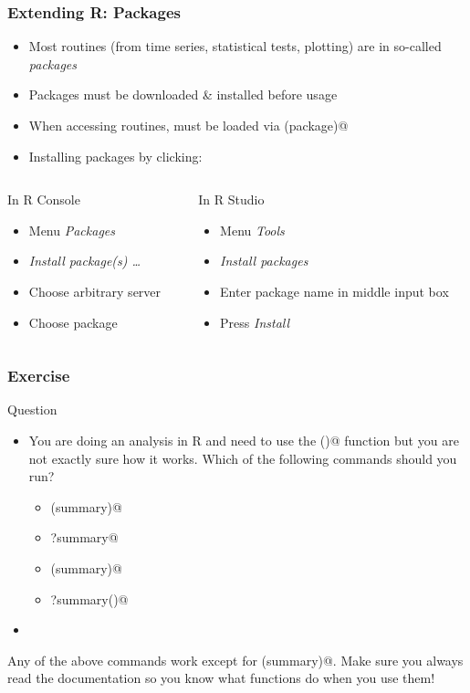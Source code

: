 \documentclass[%
  final,
  11pt, 
  show notes, %
  t, %
  fleqn, %
]{beamer}
\begin{document}
\begin{frame}[fragile]
  \frametitle{Extending R: Packages}
\vfill
\begin{itemize}
	\item Most routines (from \eg time series, statistical tests, plotting) are in so-called \emph{packages}
	\item Packages must be downloaded \& installed before usage
	\item When accessing routines, must be loaded via \verb@library(package)@
	\item Installing packages by clicking:
\end{itemize}
\begin{columns}[T]
\begin{column}{.45\textwidth}
\begin{block}{In R Console}
\begin{itemize}
\item Menu \emph{Packages} 
\item \emph{Install package(s) \ldots} 
\item Choose arbitrary server 
\item Choose package
\end{itemize}
\end{block}
\end{column}
\begin{column}{.45\textwidth}
\begin{block}{In R Studio}
\begin{itemize}
\item Menu \emph{Tools} 
\item \emph{Install packages} 
\item Enter package name in middle input box 
\item Press \emph{Install}
\end{itemize}
\end{block}
\end{column}
\end{columns}
\end{frame}

\begin{frame}[fragile]
  \frametitle{Exercise}
\vfill
\begin{exampleblock}{Question}
\begin{itemize}
\item You are doing an analysis in R and need to use the \verb@summary()@ function but you are not exactly sure how it works. Which of the following commands should you run?
\begin{itemize}
\item \verb@help(summary)@
\item \verb@?summary@
\item \verb@man(summary)@
\item \verb@?summary()@
\end{itemize}
\item \CourseQuiz
\end{itemize}
\end{exampleblock}
\ifQuizSolution
Any of the above commands work except for \verb@man(summary)@. Make sure you always read the documentation so you know what functions do when you use them!
\fi
\vfill
\end{frame}
\end{document}
